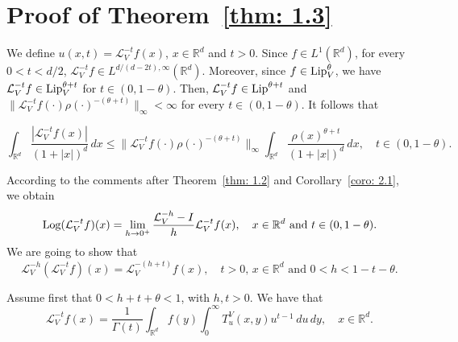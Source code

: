 \documentclass[10pt, a4paper, reqno]{amsart}
\theoremstyle{definition}
\theoremstyle{remark}
\DeclareMathOperator{\Log}{\textup{Log}}
\newcommand{\Lip}{\textup{Lip}}
\numberwithin{equation}{section}
\begin{document}
\section{Proof of Theorem~\ref{thm: 1.3}}\label{sec: 4}


We define $u(x,t) = \mathcal{L}_V^{-t} f(x)$, $x \in \mathbb{R}^d$ and $t > 0$. Since $f \in L^1(\mathbb{R}^d)$, for every $0 < t < d/2$, $\mathcal{L}_V^{-t} f \in L^{d/(d-2t),\infty}(\mathbb{R}^d)$. Moreover, since $f \in \Lip_V^\theta$, we have $\mathcal{L}_V^{-t} f \in \Lip_V^{\theta + t}$ for $t \in (0, 1-\theta)$. Then, $\mathcal{L}_V^{-t} f \in \Lip^{\theta + t}$ and $\| \mathcal{L}_V^{-t} f (\cdot) \rho(\cdot)^{-(\theta+t)} \|_\infty < \infty$ for every $t \in (0, 1-\theta)$. It follows that

\begin{equation*}
    \int_{\mathbb{R}^d} \frac{|\mathcal{L}_V^{-t} f(x)|}{(1+|x|)^d} \, dx \leq \| \mathcal{L}_V^{-t} f(\cdot) \rho(\cdot)^{-(\theta+t)} \|_{\infty}
    \int_{\mathbb{R}^d} \frac{\rho(x)^{\theta+t}}{(1+|x|)^d} \, dx, \quad t \in (0, 1-\theta).
\end{equation*}



According to the comments after Theorem~\ref{thm: 1.2} and Corollary~\ref{coro: 2.1}, we obtain
\begin{equation}\label{eq: 3.1}
    \Log (\mathcal{L}_V^{-t} f)(x) = \lim_{h \rightarrow 0^+} \frac{\mathcal{L}_V^{-h} - I}{h} \mathcal{L}_V^{-t} f(x), \quad x \in \mathbb{R}^d \text{ and } t \in (0, 1-\theta).
\end{equation}
We are going to show that
\begin{equation*}
    \mathcal{L}_V^{-h} (\mathcal{L}_V^{-t} f)(x) = \mathcal{L}_V^{-(h+t)} f(x), \quad t > 0, \, x \in \mathbb{R}^d \text{ and } 0 < h < 1 - t - \theta.
\end{equation*}

Assume first that $0 < h + t + \theta < 1$, with $h, t > 0$. We have that
\begin{equation*}
    \mathcal{L}_V^{-t} f(x) = \frac{1}{\Gamma(t)} \int_{\mathbb{R}^d} f(y) \int_0^\infty T_u^V(x,y) u^{t-1} \, du \, dy, \quad x \in \mathbb{R}^d.
\end{equation*}
\end{document}
